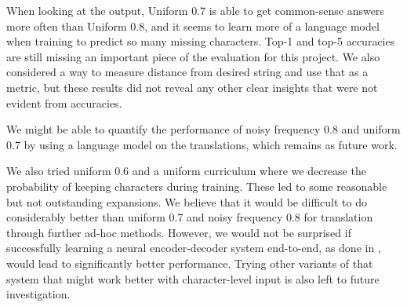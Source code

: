 \documentclass{article}
\begin{document}
When looking at the output, Uniform 0.7 is able to get common-sense answers more often than Uniform 0.8, and it seems to learn more of a language model when training to predict so many missing characters. Top-1 and top-5 accuracies are still missing an important piece of the evaluation for this project. We also considered a way to measure distance from desired string and use that as a metric, but these results did not reveal
any other clear insights that were not evident from accuracies.

We might be able to quantify the performance of noisy frequency 0.8 and uniform 0.7 by using a language model on the translations, which remains as future work.

We also tried uniform 0.6 and a uniform curriculum where we decrease the probability of keeping characters during training. These led to some reasonable but not outstanding expansions. We believe that it would be difficult to do considerably better than uniform 0.7 and noisy frequency 0.8 for translation through further ad-hoc methods. However, we would not be surprised if successfully learning a neural encoder-decoder system
end-to-end, as done in \cite{lee2019learning},
would lead to significantly better performance. Trying
other variants of that system that might work better with
character-level input is also left to future investigation.



\end{document}

